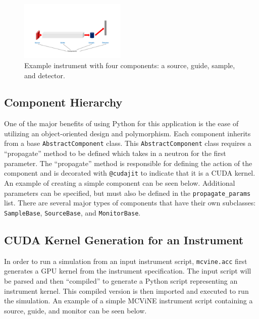 \begin{figure}[ht]
    \centering
    \includegraphics[width=0.45\textwidth, trim={3.5cm 1cm 3.5cm 5cm}, clip]{figures/mcvine_acc_instrument_component_fig.pdf}
    \caption{Example instrument with four components: a source, guide, sample, and detector.}
    \label{fig:instrument}
\end{figure}


\subsection{Component Hierarchy}

One of the major benefits of using Python for this application is the ease of utilizing an object-oriented design and polymorphism.
Each component inherits from a base \texttt{AbstractComponent} class. This \texttt{AbstractComponent} class requires a ``propagate'' method to be defined which takes in a neutron for the first parameter. The ``propagate'' method is responsible for defining the action of the component and is decorated with \texttt{@cudajit} to indicate that it is a CUDA kernel. An example of creating a simple component can be seen below. Additional parameters can be specified, but must also be defined in the \texttt{propagate\_params} list.
There are several major types of components that have their own subclasses: \texttt{SampleBase}, \texttt{SourceBase}, and \texttt{MonitorBase}.

\vspace{1mm}


\subsection{CUDA Kernel Generation for an Instrument}

In order to run a simulation from an input instrument script, \texttt{mcvine.acc} first generates a GPU kernel from the instrument specification. The input script will be parsed and then ``compiled'' to generate a Python script representing an instrument kernel. This compiled version is then imported and executed to run the simulation. An example of a simple MCViNE instrument script containing a source, guide, and monitor can be seen below.

